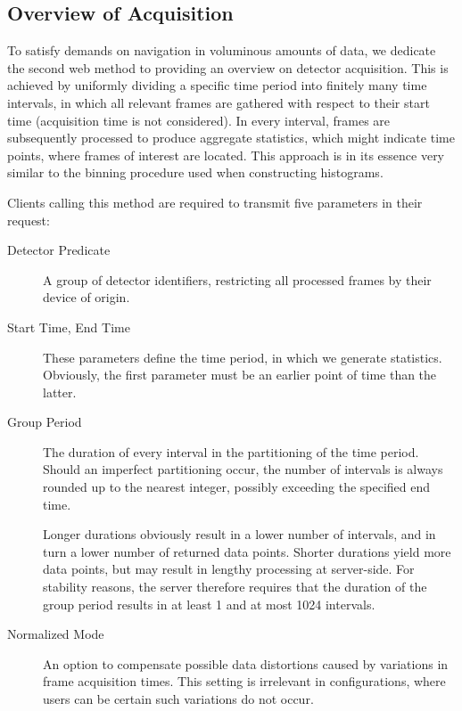 \subsection{Overview of Acquisition}
To satisfy demands on navigation in voluminous amounts of data, we dedicate the second web method to providing an overview on detector acquisition. This is achieved by uniformly dividing a specific time period into finitely many time intervals, in which all relevant frames are gathered with respect to their start time (acquisition time is not considered). In every interval, frames are subsequently processed to produce aggregate statistics, which might indicate time points, where frames of interest are located. This approach is in its essence very similar to the binning procedure used when constructing histograms.

Clients calling this method are required to transmit five parameters in their request:

\begin{description}
	\item[Detector Predicate]
	A group of detector identifiers, restricting all processed frames by their device of origin.

	\item[Start Time, End Time]
	These parameters define the time period, in which we generate statistics. Obviously, the first parameter must be an earlier point of time than the latter.

	\item[Group Period]
	The duration of every interval in the partitioning of the time period. Should an imperfect partitioning occur, the number of intervals is always rounded up to the nearest integer, possibly exceeding the specified end time.

	Longer durations obviously result in a lower number of intervals, and in turn a lower number of returned data points. Shorter durations yield more data points, but may result in lengthy processing at server-side. For stability reasons, the server therefore requires that the duration of the group period results in at least 1 and at most 1024 intervals.

	\item[Normalized Mode]
	An option to compensate possible data distortions caused by variations in frame acquisition times. This setting is irrelevant in configurations, where users can be certain such variations do not occur.
\end{description}

